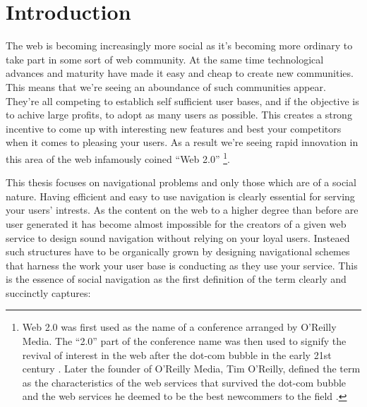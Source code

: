 \chapter{Introduction}

%
%
%
% 
%
% 

The web is becoming increasingly more social as it's becoming more ordinary to
take part in some sort of web community. At the same time technological
advances and maturity have made it easy and cheap to create new communities.
This means that we're seeing an aboundance of such communities appear.
They're all competing to establich self sufficient user bases, and if the
objective is to achive large profits, to adopt as many users
as possible. This creates a strong incentive to come up with interesting new
features and best your competitors when it comes to pleasing your users.
As a result we're seeing rapid innovation in this area of the web infamously
coined ``Web 2.0''
\footnote{Web 2.0 was first used as the name of a conference arranged by
O'Reilly Media. The ``2.0'' part of the conference name was then used to
signify the revival of interest in the web after the dot-com bubble in the
early 21st century \citep{oreilly07}.
Later the founder of O'Reilly Media, Tim O'Reilly, defined
the term as the characteristics of the web services that survived the dot-com
bubble and the web services he deemed to be the best newcommers to the
field \citep{oreilly05}.}.

This thesis focuses on navigational problems and only those which are of a
social nature. Having efficient and easy to use navigation is clearly
essential for serving your users' intrests. As the content on the web to a
higher degree than before are user generated it has become almost impossible
for the creators of a given web service to design sound navigation without
relying on your loyal users. Insteaed such structures have to be organically
grown by designing navigational schemes that harness the work your user base
is conducting as they use your service. This is the essence of social
navigation as the first definition of the term clearly and succinctly
captures:

